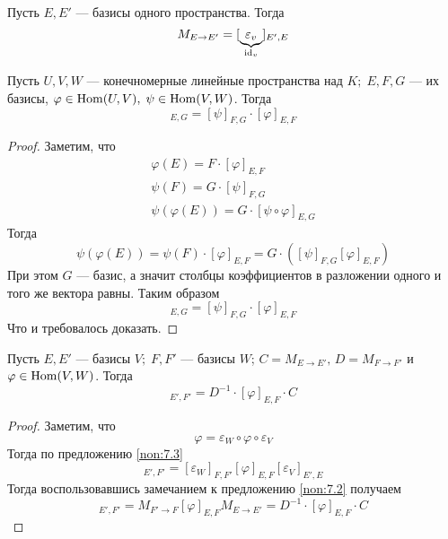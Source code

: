 \documentclass[../main.tex]{subfiles}
\begin{document}
\begin{remark}
  Пусть $E, E'$ --- базисы одного пространства. Тогда
  \begin{equation*}
    M_{E\to E'} = [\underbrace{\varepsilon_v}_{\mathclap{\id_v}}]_{E',E}
  \end{equation*}
\end{remark}

\begin{theorem-non}
\label{non:7.3}
  Пусть $U, V, W$ --- конечномерные линейные пространства над $K;\; E, F, G$ --- их базисы, $\varphi \in \operatorname{Hom}(U, V),\; \psi \in \operatorname{Hom}(V, W)$. Тогда
  \begin{equation*}
    [\psi \circ \varphi]_{E, G} = [\psi]_{F, G} \cdot [\varphi]_{E, F}
  \end{equation*}
\end{theorem-non}
\begin{proof}
  Заметим, что
  \begin{equation*}
    \begin{gathered}
      \varphi(E) = F \cdot [\varphi]_{E, F} \\
      \psi(F) = G \cdot [\psi]_{F, G} \\
      \psi(\varphi(E)) = G \cdot [\psi \circ \varphi]_{E, G}
    \end{gathered}
  \end{equation*}
  Тогда
  \begin{equation*}
    \psi(\varphi(E)) = \psi(F) \cdot [\varphi]_{E, F} = G \cdot ([\psi]_{F, G}[\varphi]_{E, F})
  \end{equation*}
  При этом $G$ --- базис, а значит столбцы коэффициентов в разложении одного и того же вектора равны. Таким образом
  \begin{equation*}
    [\psi \circ \varphi]_{E, G} = [\psi]_{F, G} \cdot [\varphi]_{E, F}
  \end{equation*}
  Что и требовалось доказать.
\end{proof}

\begin{corollary*}
  Пусть $E, E'$ --- базисы $V;\; F, F'$ --- базисы $W$; $C = M_{E\to E'},\, D = M_{F\to F'}$ и $\varphi \in \operatorname{Hom}(V, W)$. Тогда
  \begin{equation*}
    [\varphi]_{E', F'} = D^{-1} \cdot [\varphi]_{E, F} \cdot C
  \end{equation*}
\end{corollary*}
\begin{proof}
  Заметим, что
  \begin{equation*}
    \varphi = \varepsilon_W \circ \varphi \circ \varepsilon_V
  \end{equation*}
  Тогда по предложению \ref{non:7.3}
  \begin{equation*}
    [\varphi]_{E', F'} = [\varepsilon_W]_{F, F'} [\varphi]_{E, F} [\varepsilon_V]_{E', E}
  \end{equation*}
  Тогда воспользовавшись замечанием к предложению \ref{non:7.2} получаем
  \begin{equation*}
    [\varphi]_{E', F'} = M_{F'\to F} [\varphi]_{E, F} M_{E\to E'} = D^{-1} \cdot [\varphi]_{E, F} \cdot C
  \end{equation*}
\end{proof}
\end{document}
